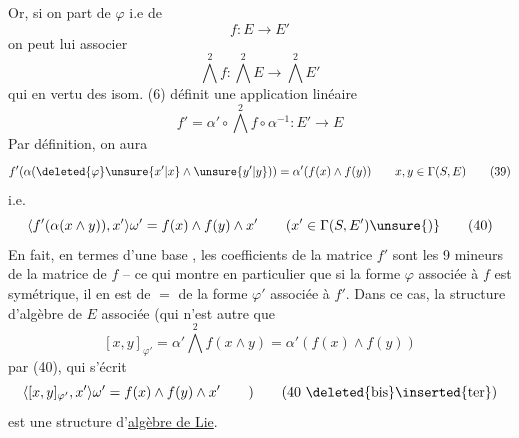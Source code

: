 Or, si on part de $\varphi$ i.e de
\[
 f:E\longrightarrow E' \tag*{(36)}
\]
on peut lui associer
\[
 \bigwedge^2 f:\bigwedge^2 E\longrightarrow\bigwedge^2 E' \tag*{(37)}
\]
qui en vertu des isom. (6) définit une application linéaire
\[
 f'=\alpha'\circ\bigwedge^2 f\circ\alpha^{-1}:E'\longrightarrow E \tag*{(38)}
\]
 Par définition, on aura
\[
 f'(\alpha(\deleted{\varphi}\unsure{x'|x}\wedge\unsure{y'|y}))=\alpha'(f(x)\wedge f(y))\qquad x,y\in\Gamma(S,E) \tag*{(39)}
\]
i.e.
\[
 \langle f'(\alpha(x\wedge y)),x'\rangle\omega'=f(x)\wedge f(y)\wedge x'\qquad(x'\in\Gamma(S,E')\unsure{)} \tag*{(40)}
\]
En fait, en termes d'une base , les coefficients de la matrice  $f'$ sont les 9 mineurs de la matrice de $f$ -- ce qui montre en particulier que si la forme  $\varphi$ associée à $f$ est symétrique, il en est de $=$ de la forme $\varphi'$ associée à $f'$. Dans ce cas, la structure d'algèbre de $E$ associée  (qui n'est autre que
\[
 [x,y]_{\varphi'}=\alpha'\bigwedge^2 f(x\wedge y)=\alpha'(f(x)\wedge f(y)) \tag*{(40 bis)}
\]
 par (40), qui s'écrit
\[
 \langle[x,y]_{\varphi'},x'\rangle\omega'=f(x)\wedge f(y)\wedge x'\qquad ) \tag*{(40 \deleted{bis}\inserted{ter})}
\]
est  une structure d'\uline{algèbre de Lie}.

